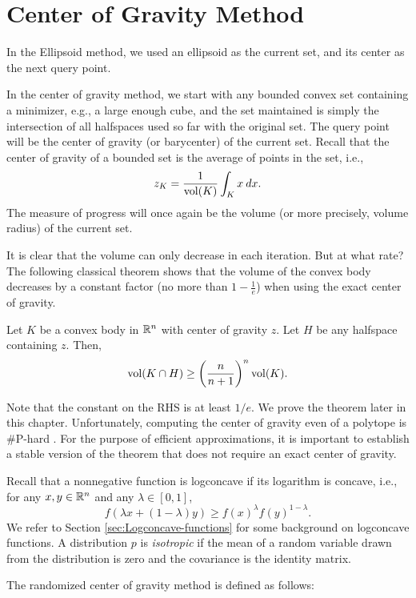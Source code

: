 \section{Center of Gravity Method}

In the Ellipsoid method, we used an ellipsoid as the current set,
and its center as the next query point.

In the center of gravity method, we start with any bounded convex
set containing a minimizer, e.g., a large enough cube, and the set
maintained is simply the intersection of all halfspaces used so far
with the original set. The query point will be the center of gravity
(or barycenter) of the current set. Recall that the center of gravity
of a bounded set is the average of points in the set, i.e., 
\[
z_{K}=\frac{1}{\mathrm{vol}(K)}\int_{K}x\:dx.
\]
The measure of progress will once again be the volume (or more precisely,
volume radius) of the current set.

It is clear that the volume can only decrease in each iteration. But
at what rate? The following classical theorem shows that the volume
of the convex body decreases by a constant factor (no more than $1-\frac{1}{e}$)
when using the exact center of gravity.
\begin{thm}
\label{thm:Grunbaum}\cite{Grunbaum1960} Let $K$ be a convex body
in $\mathbb{R}^{n}$ with center of gravity $z$. Let $H$ be any halfspace
containing $z$. Then, 
\[
\mathrm{vol}(K\cap H)\ge\left(\frac{n}{n+1}\right)^{n}\mathrm{vol}(K).
\]
\end{thm}

Note that the constant on the RHS is at least $1/e$. We prove the
theorem later in this chapter. Unfortunately, computing the center
of gravity even of a polytope is \#P-hard \cite{rademacher2007approximating}.
For the purpose of efficient approximations, it is important to establish
a stable version of the theorem that does not require an exact center
of gravity.

Recall that a nonnegative function is logconcave if its logarithm
is concave, i.e., for any $x,y\in\mathbb{R}^{n}$ and any $\lambda\in[0,1]$,
\[
f(\lambda x+(1-\lambda)y)\ge f(x)^{\lambda}f(y)^{1-\lambda}.
\]
We refer to Section \ref{sec:Logconcave-functions} for some background
on logconcave functions. A distribution $p$ is \emph{isotropic} if
the mean of a random variable drawn from the distribution is zero
and the covariance is the identity matrix.

The randomized center of gravity method is defined as follows: 

